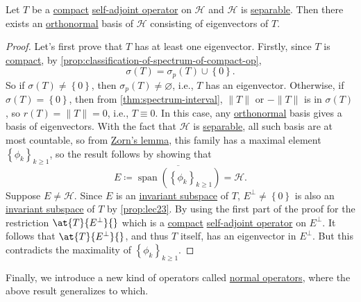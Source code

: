 \begin{theorem}\label{thm:spectral-theorem-for-compact-self-adjoint-op}
	Let \(T\) be a \hyperref[def:compact-op]{compact} \hyperref[def:self-adjoint-op]{self-adjoint operator} on \(\mathcal{H} \) and \(\mathcal{H} \) is \hyperref[def:separable]{separable}. Then there exists an \hyperref[def:orthonormal-system]{orthonormal} basis of \(\mathcal{H} \) consisting of eigenvectors of \(T\).
\end{theorem}
\begin{proof}
	Let's first prove that \(T\) has at least one eigenvector. Firstly, since \(T\) is \hyperref[def:compact-op]{compact}, by \autoref{prop:classification-of-spectrum-of-compact-op},
	\[
		\sigma (T) = \sigma _p(T) \cup \left\{ 0 \right\}.
	\]
	So if \(\sigma (T) \neq \left\{ 0 \right\} \), then \(\sigma _p(T) \neq \varnothing \), i.e., \(T\) has an eigenvector. Otherwise, if \(\sigma (T) = \left\{ 0 \right\} \), then from \autoref{thm:spectrum-interval}, \(\lVert T \rVert \) or \(-\lVert T \rVert \) is in \(\sigma (T)\), so \(r(T) = \lVert T \rVert = 0\), i.e., \(T \equiv 0\). In this case, any \hyperref[def:orthonormal-system]{orthonormal} basis gives a basis of eigenvectors. With the fact that \(\mathcal{H} \) is \hyperref[def:separable]{separable}, all such basis are at most countable, so from \href{https://en.wikipedia.org/wiki/Zorn%27s_lemma}{Zorn's lemma}, this family has a maximal element \(\left\{ \phi _k \right\}_{k\geq 1} \), so the result follows by showing that 
	\[
		E \coloneqq \overline{\mathop{\mathrm{span}}(\left\{ \phi _k \right\}_{k\geq 1} )} = \mathcal{H} .
	\]
	Suppose \(E \neq \mathcal{H} \). Since \(E\) is an \hyperref[def:invariant-subspace]{invariant subspace} of \(T\), \(E^{\perp} \neq \left\{ 0 \right\} \) is also an \hyperref[def:invariant-subspace]{invariant subspace} of \(T\) by \autoref{prop:lec23}. By using the first part of the proof for the restriction \(\at{T}{E^{\perp} }{} \) which is a \hyperref[def:compact-op]{compact} \hyperref[def:self-adjoint-op]{self-adjoint operator} on \(E^{\perp} \). It follows that \(\at{T}{E^{\perp} }{} \), and thus \(T\) itself, has an eigenvector in \(E^{\perp} \). But this contradicts the maximality of \(\left\{ \phi _k \right\}_{k\geq 1} \).
\end{proof}

Finally, we introduce a new kind of operators called \hyperref[def:normal-op]{normal operators}, where the above result generalizes to which.

